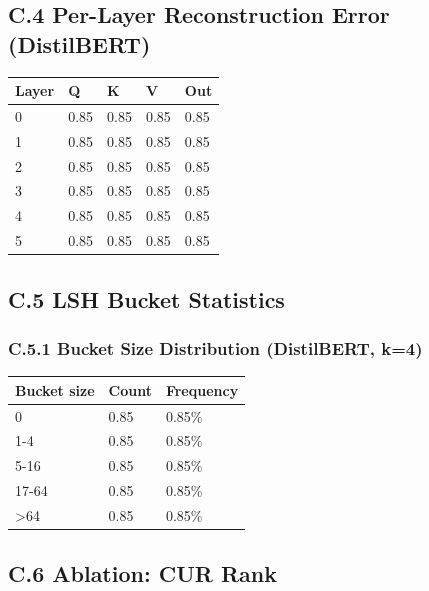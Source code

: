 \subsection{C.4 Per-Layer Reconstruction Error (DistilBERT)}

\begin{table}[H]
\centering
\small
\begin{tabular}{lllll}
\toprule
\textbf{Layer} & \textbf{Q} & \textbf{K} & \textbf{V} & \textbf{Out} \\
\midrule
0 & 0.85 & 0.85 & 0.85 & 0.85 \\
1 & 0.85 & 0.85 & 0.85 & 0.85 \\
2 & 0.85 & 0.85 & 0.85 & 0.85 \\
3 & 0.85 & 0.85 & 0.85 & 0.85 \\
4 & 0.85 & 0.85 & 0.85 & 0.85 \\
5 & 0.85 & 0.85 & 0.85 & 0.85 \\
\bottomrule
\end{tabular}
\end{table}

\subsection{C.5 LSH Bucket Statistics}

\subsubsection{C.5.1 Bucket Size Distribution (DistilBERT, k=4)}

\begin{table}[H]
\centering
\small
\begin{tabular}{lll}
\toprule
\textbf{Bucket size} & \textbf{Count} & \textbf{Frequency} \\
\midrule
0 & 0.85 & 0.85\% \\
1-4 & 0.85 & 0.85\% \\
5-16 & 0.85 & 0.85\% \\
17-64 & 0.85 & 0.85\% \\
\textgreater{}64 & 0.85 & 0.85\% \\
\bottomrule
\end{tabular}
\end{table}

\subsection{C.6 Ablation: CUR Rank}

